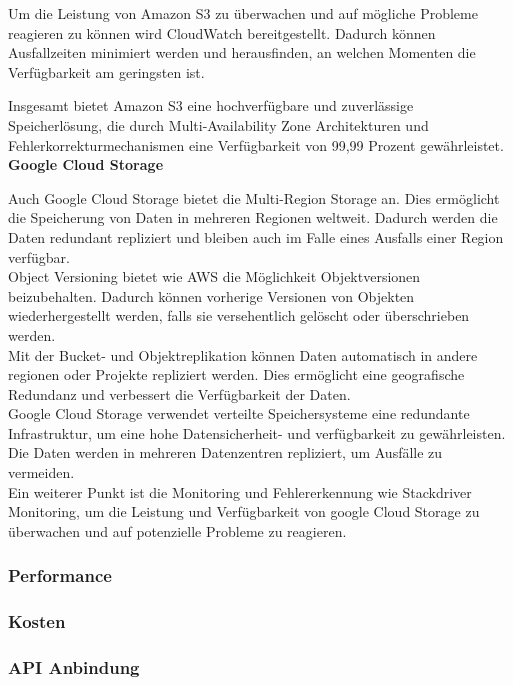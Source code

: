 Um die Leistung von Amazon S3 zu überwachen und auf mögliche Probleme reagieren zu können wird CloudWatch bereitgestellt. Dadurch können Ausfallzeiten minimiert werden und herausfinden, an welchen Momenten die Verfügbarkeit am geringsten ist.

Insgesamt bietet Amazon S3 eine hochverfügbare und zuverlässige Speicherlösung, die durch Multi-Availability Zone Architekturen und Fehlerkorrekturmechanismen eine Verfügbarkeit von 99,99 Prozent gewährleistet.\\

\textbf{Google Cloud Storage}

Auch Google Cloud Storage bietet die Multi-Region Storage an. Dies ermöglicht die Speicherung von Daten in mehreren Regionen weltweit. Dadurch werden die Daten redundant repliziert und bleiben auch im Falle eines Ausfalls einer Region verfügbar.\\ 

Object Versioning bietet wie AWS die Möglichkeit Objektversionen beizubehalten. Dadurch können vorherige Versionen von Objekten wiederhergestellt werden, falls sie versehentlich gelöscht oder überschrieben werden.\\

Mit der Bucket- und Objektreplikation können Daten automatisch in andere regionen oder Projekte repliziert werden. Dies ermöglicht eine geografische Redundanz und verbessert die Verfügbarkeit der Daten.\\

Google Cloud Storage verwendet verteilte Speichersysteme eine redundante Infrastruktur, um eine hohe Datensicherheit- und verfügbarkeit zu gewährleisten. Die Daten werden in mehreren Datenzentren repliziert, um Ausfälle zu vermeiden.\\

Ein weiterer Punkt ist die Monitoring und Fehlererkennung wie Stackdriver Monitoring, um die Leistung und Verfügbarkeit von google Cloud Storage zu überwachen und auf potenzielle Probleme zu reagieren.


\subsubsection{Performance}
\subsubsection{Kosten}
\subsubsection{API Anbindung}

